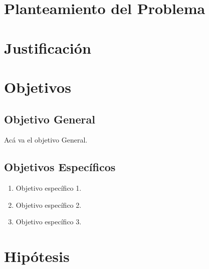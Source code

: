 \chapter{Planteamiento del Problema}

\clearpage
\chapter{Justificación}

\clearpage
\chapter{Objetivos}
\section{Objetivo General}
Acá va el objetivo General.

\section{Objetivos Específicos}
\begin{enumerate}
  \item Objetivo específico 1.
  \item Objetivo específico 2.
  \item Objetivo específico 3.
\end{enumerate}

\chapter{Hipótesis}

\clearpage